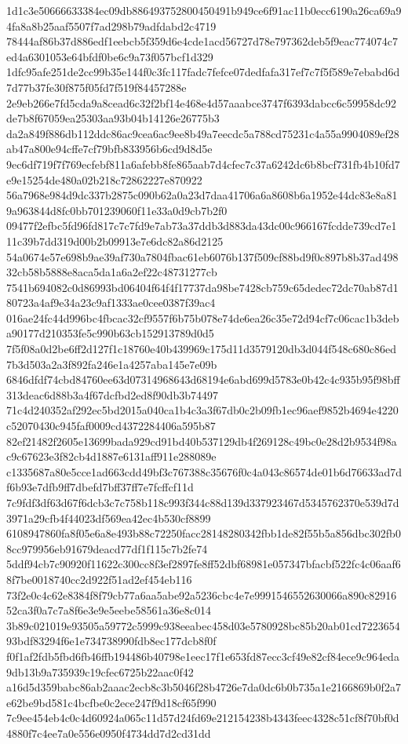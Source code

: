 \documentclass[11pt,a4paper]{article}
\begin{document}
{1d1c3e50666633384ec09db886493752800450491b949ce6f91ac11b0ecc6190a26ca69a94fa8a8b25aaf5507f7ad298b79adfdabd2c4719
78444af86b37d886edf1eebcb5f359d6e4cde1acd56727d78e797362deb5f9eac774074c7ed4a6301053e64bfdf0be6c9a73f057bcf1d329
1dfc95afe251de2cc99b35e144f0c3fc117fadc7fefce07dedfafa317ef7c7f5f589e7ebabd6d7d77b37fe30f875f05fd7f519f84457288e
2e9eb266e7fd5cda9a8cead6c32f2bf14e468e4d57aaabce3747f6393dabcc6c59958dc92de7b8f67059ea25303aa93b04b14126e26775b3
da2a849f886db112ddc86ac9cea6ac9ee8b49a7eecdc5a788cd75231c4a55a9904089ef28ab47a800e94cffe7cf79bfb833956b6cd9d8d5e
9ec6df719f7f769ecfebf811a6afebb8fe865aab7d4cfec7c37a6242dc6b8bcf731fb4b10fd7e9e15254de480a02b218c72862227e870922
56a7968e984d9dc337b2875c090b62a0a23d7daa41706a6a8608b6a1952e44dc83e8a819a963844d8fc0bb701239060f11e33a0d9cb7b2f0
09477f2efbc5fd96fd817c7c7fd9e7ab73a37ddb3d883da43dc00c966167fcdde739cd7e111c39b7dd319d00b2b09913e7e6dc82a86d2125
54a0674e57e698b9ae39af730a7804fbac61eb6076b137f509cf88bd9f0c897b8b37ad49832cb58b5888e8aca5da1a6a2ef22c48731277cb
7541b694082c0d86993bd06404f64f4f17737da98be7428cb759c65dedec72dc70ab87d180723a4af9e34a23c9af1333ae0cee0387f39ac4
016ae24fc44d996bc4fbcac32cf9557f6b75b078e74de6ea26c35e72d94cf7c06cac1b3deba90177d210353fe5c990b63cb152913789d0d5
7f5f08a0d2be6ff2d127f1c18760e40b439969c175d11d3579120db3d044f548c680c86ed7b3d503a2a3f892fa246e1a4257aba145e7e09b
6846dfdf74cbd84760ee63d07314968643d68194e6abd699d5783e0b42c4c935b95f98bff313deac6d88b3a4f67dcfbd2ed8f90db3b74497
71c4d240352af292ec5bd2015a040ca1b4c3a3f67db0c2b09fb1ec96aef9852b4694e4220c52070430c945faf0009cd4372284406a595b87
82ef21482f2605e13699bada929cd91bd40b537129db4f269128c49bc0e28d2b9534f98ac9c67623e3f82cb4d1887e6131aff911e288089e
c1335687a80e5cce1ad663cdd49bf3c767388c35676f0c4a043c86574de01b6d76633ad7df6b93e7dfb9ff7dbefd7bff37ff7e7fcffcf11d
7c9fdf3df63d67f6dcb3c7c758b118c993f344c88d139d337923467d5345762370e539d7d3971a29cfb4f44023df569ea42ec4b530cf8899
6108947860fa8f05e6a8e493b88c72250facc28148280342fbb1de82f55b5a856dbc302fb08cc979956eb91679deacd77df1f115c7b2fe74
5ddf94cb7c90920f11622c300cc8f3ef2897fe8ff52dbf68981e057347bfacbf522fc4c06aaf68f7be0018740cc2d922f51ad2ef454eb116
73f2e0c4c62e8384f8f79cb77a6aa5abe92a5236cbc4e7e9991546552630066a890c8291652ca3f0a7c7a8f6e3e9e5eebe58561a36e8c014
3b89c021019e93505a59772c5999c938eeabec458d03e5780928bc85b20ab01cd722365493bdf83294f6e1e734738990fdb8ec177dcb8f0f
f0f1af2fdb5fbd6fb46ffb194486b40798e1eec17f1e653fd87ecc3cf49e82cf84ece9c964eda9db13b9a735939c19cfec6725b22aac0f42
a16d5d359babc86ab2aaac2ecb8c3b5046f28b4726e7da0dc6b0b735a1e2166869b0f2a7e62be9bd581c4bcfbe0c2ece247f9d18cf65f990
7c9ee454eb4c0c4d60924a065c11d57d24fd69e212154238b4343feec4328c51cf8f70bf0d4880f7c4ee7a0e556e0950f4734dd7d2cd31dd
}
\end{document}
